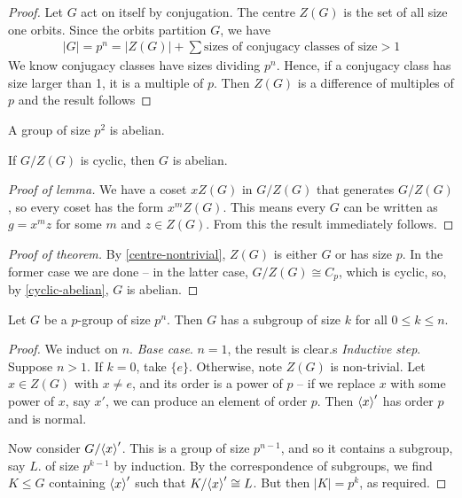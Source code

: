 \documentclass{../../template/note}
\begin{document}
    \begin{proof}
        Let $G$ act on itself by conjugation. The centre $Z(G)$ is the set of all size one orbits. Since the orbits partition $G$, we have
        \begin{align*}
            |G| = p^n = |Z(G)| + \sum \text{sizes of conjugacy classes of size} >1
        \end{align*}
        We know conjugacy classes have sizes dividing $p^n$. Hence, if a conjugacy class has size larger than 1, it is a multiple of $p$. Then $Z(G)$ is a difference of multiples of $p$ and the result follows
    \end{proof}
    
    \begin{theorem}
        A group of size $p^2$ is abelian.
    \end{theorem}
    
    \begin{lemma}
        If $G/Z(G)$ is cyclic, then $G$ is abelian.
        \label{cyclic-abelian}
    \end{lemma}
    
    \begin{proof}[Proof of lemma]
        We have a coset $xZ(G)$ in $G/Z(G)$ that generates $G/Z(G)$, so every coset has the form $x^mZ(G)$. This means every $G$ can be written as $g=x^mz$ for some $m$ and $z \in Z(G)$. From this the result immediately follows.
    \end{proof}
    
    \begin{proof}[Proof of theorem]
        By \cref{centre-nontrivial}, $Z(G)$ is either $G$ or has size $p$. In the former case we are done -- in the latter case, $G/Z(G) \cong C_p$, which is cyclic, so, by \cref{cyclic-abelian}, $G$ is abelian.
    \end{proof}
    
    \begin{theorem}
        Let $G$ be a $p$-group of size $p^n$. Then $G$ has a subgroup of size $k$ for all $0 \leq k \leq n$.
    \end{theorem}
    
    \begin{proof}
        We induct on $n$.
        \emph{Base case}. $n=1$, the result is clear.s
        \emph{Inductive step}. Suppose $n > 1$. If $k=0$, take $\{e\}$. Otherwise, note $Z(G)$ is non-trivial. Let $x \in Z(G)$ with $x \neq e$, and its order is a power of $p$ -- if we replace $x$ with some power of $x$, say $x'$, we can produce an element of order $p$. Then $\left \langle x \right \rangle'$ has order $p$ and is normal.

        Now consider $G/\!\left \langle x \right \rangle'$. This is a group of size $p^{n-1}$, and so it contains a subgroup, say $L$. of size $p^{k-1}$ by induction. By the correspondence of subgroups, we find $K \leq G$ containing $\left \langle x \right \rangle'$ such that $K/\!\left \langle x \right \rangle' \cong L$. But then $|K| = p^k$, as required.
    \end{proof}
    
\end{document}
